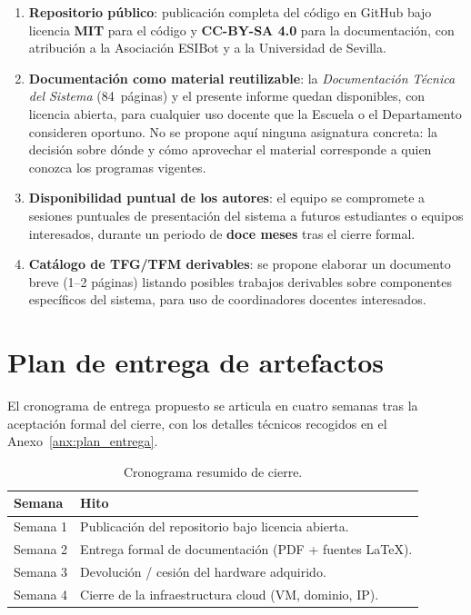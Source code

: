 \begin{enumerate}[leftmargin=*]
    \item \textbf{Repositorio p\'ublico}: publicaci\'on completa del
    c\'odigo en GitHub bajo licencia \textbf{MIT} para el
    c\'odigo y \textbf{CC-BY-SA 4.0} para la documentaci\'on, con
    atribuci\'on a la Asociaci\'on ESIBot y a la Universidad de Sevilla.

    \item \textbf{Documentaci\'on como material reutilizable}: la
    \textit{Documentaci\'on T\'ecnica del Sistema} (84~p\'aginas) y el
    presente informe quedan disponibles, con licencia abierta, para
    cualquier uso docente que la Escuela o el Departamento consideren
    oportuno. No se propone aqu\'i ninguna asignatura concreta: la
    decisi\'on sobre d\'onde y c\'omo aprovechar el material corresponde a
    quien conozca los programas vigentes.

    \item \textbf{Disponibilidad puntual de los autores}: el equipo se
    compromete a sesiones puntuales de presentaci\'on del sistema a
    futuros estudiantes o equipos interesados, durante un periodo de
    \textbf{doce meses} tras el cierre formal.

    \item \textbf{Cat\'alogo de TFG/TFM derivables}: se propone elaborar
    un documento breve (1--2 p\'aginas) listando posibles trabajos
    derivables sobre componentes espec\'ificos del sistema, para uso
    de coordinadores docentes interesados.
\end{enumerate}

\section{Plan de entrega de artefactos}

El cronograma de entrega propuesto se articula en cuatro semanas tras
la aceptaci\'on formal del cierre, con los detalles t\'ecnicos
recogidos en el Anexo~\ref{anx:plan_entrega}.

\begin{table}[H]
    \centering
    \caption{Cronograma resumido de cierre.}
    \label{tab:cronograma}
    \begin{tabular}{ll}
        \toprule
        \textbf{Semana} & \textbf{Hito} \\
        \midrule
        Semana 1 & Publicaci\'on del repositorio bajo licencia abierta. \\
        Semana 2 & Entrega formal de documentaci\'on (PDF + fuentes LaTeX). \\
        Semana 3 & Devoluci\'on / cesi\'on del hardware adquirido. \\
        Semana 4 & Cierre de la infraestructura cloud (VM, dominio, IP). \\
        \bottomrule
    \end{tabular}
\end{table}


